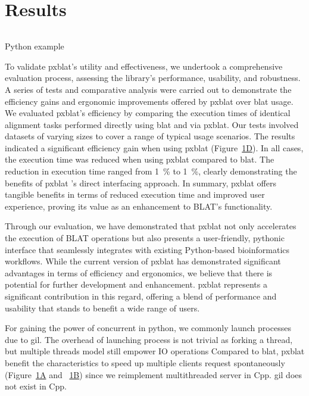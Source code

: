 \section*{Results}\label{sec:results}

\begin{listing}
	\inputminted[linenos]{python}{codes/example1.py}
	\caption{Python example}
	\label{listing:1}
\end{listing}


To validate \acrshort{pxblat}'s utility and effectiveness, we undertook a comprehensive evaluation process, assessing the library's performance, usability, and robustness.
A series of tests and comparative analysis were carried out to demonstrate the efficiency gains and ergonomic improvements offered by \acrshort{pxblat} over \acrshort{blat} usage.
We evaluated \acrshort{pxblat}'s efficiency by comparing the execution times of identical alignment tasks performed directly using \acrshort{blat}  and via \acrshort{pxblat}.
Our tests involved datasets of varying sizes to cover a range of typical usage scenarios.
The results indicated a significant efficiency gain when using \acrshort{pxblat} (Figure~\hyperref[fig:pxblat]{1D}).
In all cases, the execution time was reduced when using \acrshort{pxblat} compared to \acrshort{blat}.
The reduction in execution time ranged from \SI{1}{\percent} to \SI{1}{\percent}, clearly demonstrating the benefits of \acrshort{pxblat} 's direct interfacing approach.
In summary, \acrshort{pxblat}  offers tangible benefits in terms of reduced execution time and improved user experience, proving its value as an enhancement to BLAT's functionality.

Through our evaluation, we have demonstrated that \acrshort{pxblat} not only accelerates the execution of BLAT operations but also presents a user-friendly,
pythonic interface that seamlessly integrates with existing Python-based bioinformatics workflows.
While the current version of \acrshort{pxblat}  has demonstrated significant advantages in terms of efficiency and ergonomics, we believe that there is potential for further development and enhancement.
\acrshort{pxblat} represents a significant contribution in this regard, offering a blend of performance and usability that stands to benefit a wide range of users.

For gaining the power of concurrent in python, we commonly launch processes due to \acrfull{gil}.
The overhead of launching process is not trivial as forking a thread, but multiple threads model still empower IO operations
Compared to \acrshort{blat}, \acrshort{pxblat} benefit the characteristics to speed up multiple clients request spontaneously (Figure~\hyperref[fig:pxblat]{1A} and ~\hyperref[fig:pxblat]{1B}) since we reimplement multithreaded server in Cpp.
\acrshort{gil} does not exist in Cpp.


